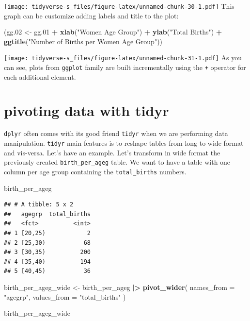 \documentclass[
]{book}
\newenvironment{Shaded}{\begin{snugshade}}{\end{snugshade}}
\newcommand{\AttributeTok}[1]{\textcolor[rgb]{0.13,0.29,0.53}{#1}}
\newcommand{\FloatTok}[1]{\textcolor[rgb]{0.00,0.00,0.81}{#1}}
\newcommand{\FunctionTok}[1]{\textcolor[rgb]{0.13,0.29,0.53}{\textbf{#1}}}
\newcommand{\NormalTok}[1]{#1}
\newcommand{\OtherTok}[1]{\textcolor[rgb]{0.56,0.35,0.01}{#1}}
\newcommand{\SpecialCharTok}[1]{\textcolor[rgb]{0.81,0.36,0.00}{\textbf{#1}}}
\newcommand{\StringTok}[1]{\textcolor[rgb]{0.31,0.60,0.02}{#1}}
\begin{document}
\texttt{[image: tidyverse-s\_files/figure-latex/unnamed-chunk-30-1.pdf]}
This graph can be customize adding labels and title to the plot:

\begin{Shaded}
\begin{Highlighting}[]
\NormalTok{(gg}\FloatTok{.02} \OtherTok{\textless{}{-}}
\NormalTok{  gg}\FloatTok{.01} \SpecialCharTok{+}
  \FunctionTok{xlab}\NormalTok{(}\StringTok{"Women Age Group"}\NormalTok{) }\SpecialCharTok{+}
  \FunctionTok{ylab}\NormalTok{(}\StringTok{"Total Births"}\NormalTok{) }\SpecialCharTok{+}
  \FunctionTok{ggtitle}\NormalTok{(}\StringTok{"Number of Births per Women Age Group"}\NormalTok{))}
\end{Highlighting}
\end{Shaded}

\texttt{[image: tidyverse-s\_files/figure-latex/unnamed-chunk-31-1.pdf]}
As you can see, plots from \texttt{ggplot} family are built incrementally using the \texttt{+} operator for each additional element.

\section{pivoting data with tidyr}\label{pivoting-data-with-tidyr}

\texttt{dplyr} often comes with its good friend \texttt{tidyr} when we are performing data manipulation. \texttt{tidyr} main features is to reshape tables from long to wide format and vis-versa. Let's have an example.
Let's transform in wide format the previously created \texttt{birth\_per\_ageg} table.
We want to have a table with one column per age group containing the \texttt{total\_births} numbers.

\begin{Shaded}
\begin{Highlighting}[]
\NormalTok{birth\_per\_ageg}
\end{Highlighting}
\end{Shaded}

\begin{verbatim}
## # A tibble: 5 x 2
##   agegrp  total_births
##   <fct>          <int>
## 1 [20,25)            2
## 2 [25,30)           68
## 3 [30,35)          200
## 4 [35,40)          194
## 5 [40,45)           36
\end{verbatim}

\begin{Shaded}
\begin{Highlighting}[]
\NormalTok{birth\_per\_ageg\_wide }\OtherTok{\textless{}{-}}
\NormalTok{  birth\_per\_ageg }\SpecialCharTok{|\textgreater{}}
  \FunctionTok{pivot\_wider}\NormalTok{(}
    \AttributeTok{names\_from =} \StringTok{"agegrp"}\NormalTok{, }
    \AttributeTok{values\_from =} \StringTok{"total\_births"}
\NormalTok{  )}

\NormalTok{birth\_per\_ageg\_wide}
\end{Highlighting}
\end{Shaded}
\end{document}
